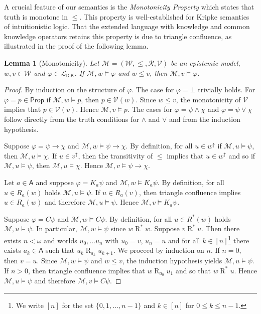 \documentclass{myifcolog}
\newcommand\C {C}
\newcommand{\K}{K}
\newcommand\Prop {\mathsf{Prop}}
\newcommand\A{\mathsf{A}}
\newcommand{\agi}{a}
\newcommand{\ICK}{\mathsf{ICK}}
\newcommand{\LICK}{\mathcal{L}_{\ICK}}
\newcommand{\fw}{\mathcal{M}}
\newcommand{\Rel}{\mathrel{R}}
\newcommand{\W}{\mathcal{W}}
\newcommand{\rel}{\mathcal{R}}
\newcommand{\V}{\mathcal{V}}
\newtheorem{lemma}[theorem]{Lemma}
\numberwithin{theorem}{section}
\begin{document}
A crucial feature of our semantics is the \emph{Monotonicity Property} which states that truth is monotone in $\leq$. This property is well-established for Kripke semantics of intuitionistic logic. That the extended language with knowledge and common knowledge operators retains this property is due to triangle confluence, as illustrated in the proof of the following lemma.

\begin{lemma}[Monotonicity]\label{l: monotonicity}
    Let $\fw=(\W, \leq, \rel, \V)$ be an epistemic model, $w, v \in \W$ and $\varphi \in \LICK$. If $\fw, w \models \varphi$ and $w \leq v$, then $\fw, v \models \varphi$.
\end{lemma}
\begin{proof}
    By induction on the structure of $\varphi$. The case for $\varphi= \bot$ trivially holds. For $\varphi = p \in \Prop$ if $\fw, w \models p$, then $p \in \V(w)$. Since $w \leq v$, the monotonicity of $\V$ implies that $p \in \V(v)$. Hence $\fw, v \models p$. The cases for $\varphi = \psi \wedge \chi$ and $\varphi = \psi \vee \chi$ follow directly from the truth conditions for $\wedge$ and $\vee$ and from the induction hypothesis. \smallskip
    
   \noindent Suppose $\varphi = \psi \rightarrow \chi$ and $\fw,w \models \psi \rightarrow \chi$. By definition, for all $u \in w^\uparrow$ if $\fw,u \models \psi$, then $\fw,u \models \chi$. If $u \in v^\uparrow$, then the transitivity of $\leq$ implies that $u \in w^\uparrow$ and so if $\fw, u \models \psi$, then $\fw, u \models \chi$. Hence $\fw, v \models \psi \rightarrow \chi$. \smallskip

   \noindent Let $\agi \in \A$ and suppose $\varphi = \K_\agi \psi$ and $\fw, w \models \K_\agi \psi$. By definition, for all $u \in R_\agi(w)$ holds $\fw, u \models \psi$. If $u \in R_\agi(v)$, then triangle confluence implies $u \in R_\agi(w)$ and therefore $\fw, u \models \psi$. Hence $\fw, v \models \K_\agi \psi$. \smallskip

   \noindent Suppose $\varphi = \C \psi$ and $\fw, w \models \C \psi$. By definition, for all $u \in R^*(w)$ holds $\fw, u \models \psi$. In particular, $\fw, w \models \psi$ since $w \Rel^* w$. Suppose $v \Rel^* u$. Then there exists $n < \omega$ and worlds $u_0, \ldots u_n$ with $u_0 = v$, $u_n = u$ and for all $k \in [n]$\footnote{We write $[n]$ for the set $\{0, 1, \ldots, n-1\}$ and $k \in [n]$ for $0 \leq k \leq n-1$.} there exists $\agi_k \in \A$ such that $u_k \Rel_{\agi_k} u_{k+1}$. We proceed by induction on $n$. If $n = 0$, then $v = u$. Since $\fw, w \models \psi$ and $w \leq v$, the induction hypothesis yields $\fw, u \models \psi$. If $n > 0$, then triangle confluence implies that $w \Rel_{\agi_0} u_1$ and so that $w \Rel^* u$. Hence $\fw, u \models \psi$ and therefore $\fw, v \models \C \psi$.
\end{proof}
\end{document}
